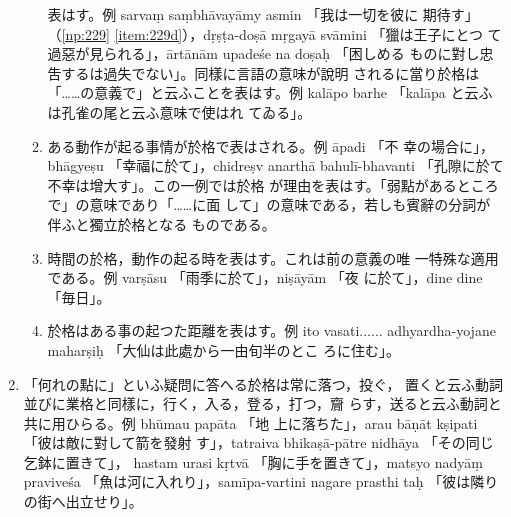 \begin{enumerate}[label=(\arabic*)]
\begin{enumerate}[label=(\alph*)]
表はす。例 sarvaṃ saṃbhāvayāmy asmin 「我は一切を彼に
期待す」（\ref{np:229} \ref{item:229d}），dṛṣṭa-doṣā mṛgayā svāmini 「獵は王子にとつ
て過惡が見られる」，ārtānām upadeśe na doṣaḥ 「困しめる
ものに對し忠吿するは過失でない」。同樣に言語の意味が說明
されるに當り於格は「……の意義で」と云ふことを表はす。例
kalāpo barhe 「kalāpa と云ふは孔雀の尾と云ふ意味で使はれ
てゐる」。
\item ある動作が起る事情が於格で表はされる。例 āpadi 「不
幸の場合に」，bhāgyeṣu 「幸福に於て」，chidreṣv anarthā
bahulī-bhavanti 「孔隙に於て不幸は增大す」。この一例では於格
が理由を表はす。「弱點があるところで」の意味であり「……に面
して」の意味である，若しも賓辭の分詞が伴ふと獨立於格となる
ものである。
\item 時間の於格，動作の起る時を表はす。これは前の意義の唯
一特殊な適用である。例 varṣāsu 「雨季に於て」，niṣāyām 「夜
に於て」，dine dine 「毎日」。
\item 於格はある事の起つた距離を表はす。例 ito vasati......
adhyardha-yojane maharṣiḥ 「大仙は此處から一由旬半のとこ
ろに住む」。
\end{enumerate}
\item 「何れの點に」といふ疑問に答へる於格は常に落つ，投ぐ，
置くと云ふ動詞並びに業格と同樣に，行く，入る，登る，打つ，齎
らす，送ると云ふ動詞と共に用ひらる。例 bhūmau papāta 「地
上に落ちた」，arau bāṇāt kṣipati 「彼は敵に對して箭を發射
す」，tatraiva bhikaṣā-pātre nidhāya 「その同じ乞鉢に置きて」，
hastam urasi kṛtvā 「胸に手を置きて」，matsyo nadyāṃ
praviveśa 「魚は河に入れり」，samīpa-vartini nagare prasthi\-%
taḥ 「彼は隣りの街へ出立せり」。


\end{enumerate}
